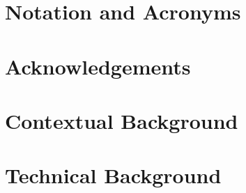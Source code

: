 \documentclass[ %
                    author={Alexander Dalton},
                supervisor={Prof. Seth Bullock},
                    degree={MEng},
                     title={Exploring Evolutionary Hardware:},
                  subtitle={Evolved Binary Arithmetic Circuits and Dynamic Problems},
                      type={research},
                      year={2018} ]{dissertation}
\begin{document}



\chapter*{Notation and Acronyms}




\chapter*{Acknowledgements}




%

\mainmatter


\chapter{Contextual Background}
\label{chap:context}




\chapter{Technical Background}
\label{chap:technical}


\end{document}
